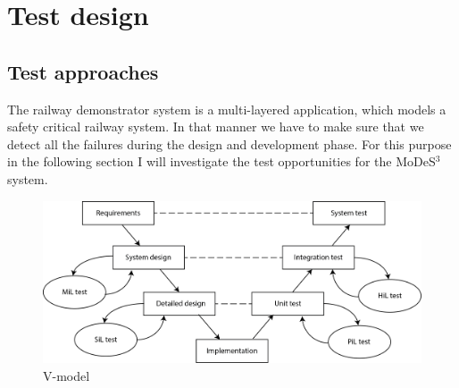 \chapter{Test design}
\section{Test approaches}
The railway demonstrator system is a multi-layered application, which models a safety critical railway system. In that manner we have to make sure that we detect all the failures during the design and development phase. For this purpose in the following section I will investigate the test opportunities for the MoDeS$^3$ system.

\begin{figure}[h]
	\centering
	\includegraphics[width=150mm]{figures/modes3/v_model.png}
	\caption{V-model}
	\label{fig:vModel}
\end{figure}

